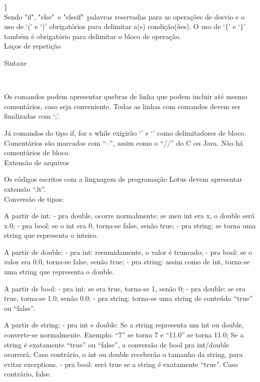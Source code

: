 \documentclass[12pt,a4paper]{article}
\begin{document}
\}\\


Sendo "if", "else"\ e "elseif"\ palavras reservadas para as operações de desvio e o uso de `(' e `)' obrigatórios para delimitar a(s) condição(ões). O uso de `$\{$' e `$\}$' também é obrigatório para delimitar o bloco de operação.\\


\hypertarget{Laços de repetição}{\Large{Laços de repetição}}\\[0.3cm]
\normalsize


\hypertarget{Sintaxe}{\Large{Sintaxe}}\\[0.3cm]
\normalsize

Os comandos podem apresentar quebras de linha que podem incluir até mesmo comentários, caso seja conveniente. Todas as linhas com comandos devem ser finalizadas com `;'.

Já comandos do tipo if, for e while exigirão `{' e `}' como delimitadores de bloco.
Comentários são marcados com ``--'', assim como o ``//'' do C ou Java. Não há comentários de bloco.\\


\hypertarget{Extensão de arquivos}{\Large{Extensão de arquivos}}\\[0.3cm]
\normalsize

Os códigos escritos com a linguagem de programação Lotus devem apresentar extensão ``.lt''.\\


Conversão de tipos:

A partir de int:
- pra double, ocorre normalmente: se meu int era x, o double será x.0;
- pra bool: se o int era 0, torna-se false, senão true;
- pra string: se torna uma string que representa o inteiro.

A partir de double:
- pra int: resumidamente, o valor é truncado;
- pra bool: se o valor era 0.0, torna-se false, senão true;
- pra string: assim como de int, torna-se uma string que representa o double.

A partir de bool:
- pra int: se era true, torna-se 1, senão 0;
- pra double: se era true, torna-se 1.0, senão 0.0;
- pra string: torna-se uma string de conteúdo ``true'' ou ``false''.

A partir de string:
- pra int e double:
Se a string representa um int ou double, converte-se normalmente. Exemplo: ``7'' se torna 7 e ``11.0'' se torna 11.0;
Se a string é exatamente ``true'' ou ``false'', a conversão de bool pra int/double ocorrerá;
Caso contrário, o int ou double receberão o tamanho da string, para evitar exceptions.
- pra bool: será true se a string é exatamente ``true''. Caso contrário, false.
\end{document}
